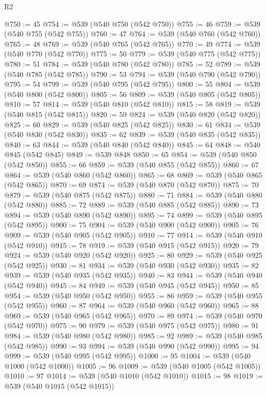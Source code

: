 \begin{lexlean}{R2}
\begin{coremodule}
@750 := 45
@754 := @539 (@540 @750 (@542 @750))
@755 := 46
@759 := @539 (@540 @755 (@542 @755))
@760 := 47
@764 := @539 (@540 @760 (@542 @760))
@765 := 48
@769 := @539 (@540 @765 (@542 @765))
@770 := 49
@774 := @539 (@540 @770 (@542 @770))
@775 := 50
@779 := @539 (@540 @775 (@542 @775))
@780 := 51
@784 := @539 (@540 @780 (@542 @780))
@785 := 52
@789 := @539 (@540 @785 (@542 @785))
@790 := 53
@794 := @539 (@540 @790 (@542 @790))
@795 := 54
@799 := @539 (@540 @795 (@542 @795))
@800 := 55
@804 := @539 (@540 @800 (@542 @800))
@805 := 56
@809 := @539 (@540 @805 (@542 @805))
@810 := 57
@814 := @539 (@540 @810 (@542 @810))
@815 := 58
@819 := @539 (@540 @815 (@542 @815))
@820 := 59
@824 := @539 (@540 @820 (@542 @820))
@825 := 60
@829 := @539 (@540 @825 (@542 @825))
@830 := 61
@834 := @539 (@540 @830 (@542 @830))
@835 := 62
@839 := @539 (@540 @835 (@542 @835))
@840 := 63
@844 := @539 (@540 @840 (@542 @840))
@845 := 64
@848 := @540 @845 (@542 @845)
@849 := @539 @848
@850 := 65
@854 := @539 (@540 @850 (@542 @850))
@855 := 66
@859 := @539 (@540 @855 (@542 @855))
@860 := 67
@864 := @539 (@540 @860 (@542 @860))
@865 := 68
@869 := @539 (@540 @865 (@542 @865))
@870 := 69
@874 := @539 (@540 @870 (@542 @870))
@875 := 70
@879 := @539 (@540 @875 (@542 @875))
@880 := 71
@884 := @539 (@540 @880 (@542 @880))
@885 := 72
@889 := @539 (@540 @885 (@542 @885))
@890 := 73
@894 := @539 (@540 @890 (@542 @890))
@895 := 74
@899 := @539 (@540 @895 (@542 @895))
@900 := 75
@904 := @539 (@540 @900 (@542 @900))
@905 := 76
@909 := @539 (@540 @905 (@542 @905))
@910 := 77
@914 := @539 (@540 @910 (@542 @910))
@915 := 78
@919 := @539 (@540 @915 (@542 @915))
@920 := 79
@924 := @539 (@540 @920 (@542 @920))
@925 := 80
@929 := @539 (@540 @925 (@542 @925))
@930 := 81
@934 := @539 (@540 @930 (@542 @930))
@935 := 82
@939 := @539 (@540 @935 (@542 @935))
@940 := 83
@944 := @539 (@540 @940 (@542 @940))
@945 := 84
@949 := @539 (@540 @945 (@542 @945))
@950 := 85
@954 := @539 (@540 @950 (@542 @950))
@955 := 86
@959 := @539 (@540 @955 (@542 @955))
@960 := 87
@964 := @539 (@540 @960 (@542 @960))
@965 := 88
@969 := @539 (@540 @965 (@542 @965))
@970 := 89
@974 := @539 (@540 @970 (@542 @970))
@975 := 90
@979 := @539 (@540 @975 (@542 @975))
@980 := 91
@984 := @539 (@540 @980 (@542 @980))
@985 := 92
@989 := @539 (@540 @985 (@542 @985))
@990 := 93
@994 := @539 (@540 @990 (@542 @990))
@995 := 94
@999 := @539 (@540 @995 (@542 @995))
@1000 := 95
@1004 := @539 (@540 @1000 (@542 @1000))
@1005 := 96
@1009 := @539 (@540 @1005 (@542 @1005))
@1010 := 97
@1014 := @539 (@540 @1010 (@542 @1010))
@1015 := 98
@1019 := @539 (@540 @1015 (@542 @1015))

\end{coremodule}
\end{lexlean}
